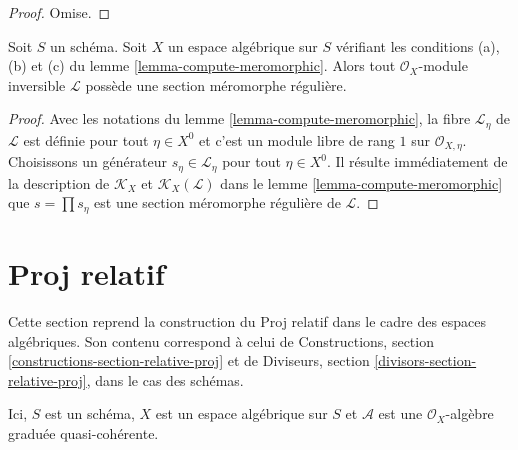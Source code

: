 \begin{proof}
Omise.
\end{proof}

\begin{lemma}
\label{lemma-regular-meromorphic-section-exists}
Soit $S$ un schéma. Soit $X$ un espace algébrique sur $S$
vérifiant les conditions (a), (b) et (c) du
lemme \ref{lemma-compute-meromorphic}.
Alors tout $\mathcal{O}_X$-module inversible $\mathcal{L}$ possède
une section méromorphe régulière.
\end{lemma}

\begin{proof}
Avec les notations du lemme \ref{lemma-compute-meromorphic},
la fibre $\mathcal{L}_\eta$ de $\mathcal{L}$ est définie pour tout
$\eta \in X^0$ et c'est un module libre de rang $1$ sur $\mathcal{O}_{X, \eta}$.
Choisissons un générateur $s_\eta \in \mathcal{L}_\eta$ pour tout $\eta \in X^0$.
Il résulte immédiatement de la description de
$\mathcal{K}_X$ et $\mathcal{K}_X(\mathcal{L})$
dans le lemme \ref{lemma-compute-meromorphic}
que $s = \prod s_\eta$ est une section méromorphe régulière de $\mathcal{L}$.
\end{proof}












\section{Proj relatif}
\label{section-relative-proj}

\noindent
Cette section reprend la construction du Proj relatif
dans le cadre des espaces algébriques. Son contenu
correspond à celui de Constructions, section
\ref{constructions-section-relative-proj}
et de Diviseurs, section \ref{divisors-section-relative-proj},
dans le cas des schémas.

\begin{situation}
\label{situation-relative-proj}
Ici, $S$ est un schéma, $X$ est un espace algébrique sur $S$ et
$\mathcal{A}$ est une $\mathcal{O}_X$-algèbre graduée quasi-cohérente.
\end{situation}

